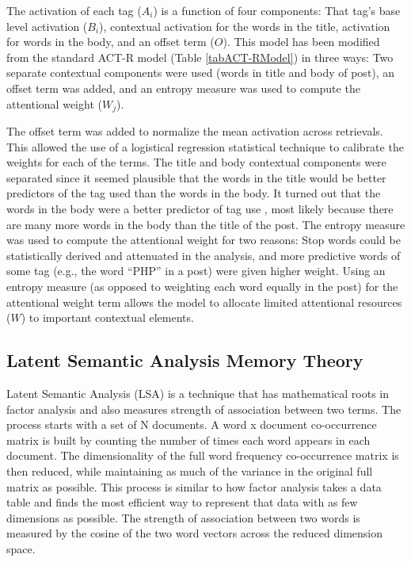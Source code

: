\documentclass[man,floatsintext,donotrepeattitle]{apa6}
\begin{document}
The activation of each tag ($A_{i}$) is a function of four components:
That tag's base level activation ($B_{i}$), contextual activation for the words in the title, activation for words in the body, and an offset term ($O$).
This model has been modified from the standard ACT-R model (Table \ref{tabACT-RModel}) in three ways:
Two separate contextual components were used (words in title and body of post), an offset term was added, and an entropy measure was used to compute the attentional weight ($W_{j}$).

The offset term was added to normalize the mean activation across retrievals.
This allowed the use of a logistical regression statistical technique to calibrate the weights for each of the terms.
The title and body contextual components were separated since it seemed plausible that the words in the title would be better predictors of the tag used than the words in the body.
It turned out that the words in the body were a better predictor of tag use \parencite{Stanley2013}, most likely because there are many more words in the body than the title of the post.
The entropy measure was used to compute the attentional weight for two reasons:
Stop words could be statistically derived and attenuated in the analysis, and more predictive words of some tag (e.g., the word ``PHP'' in a post) were given higher weight.
Using an entropy measure (as opposed to weighting each word equally in the post) for the attentional weight term allows the model to allocate limited attentional resources ($W$) to important contextual elements.

\subsection{Latent Semantic Analysis Memory Theory}

Latent Semantic Analysis \parencite{Landauer1997} (LSA) is a technique that has mathematical roots in factor analysis and also measures strength of association between two terms.
The process starts with a set of N documents.
A word x document co-occurrence matrix is built by counting the number of times each word appears in each document.
The dimensionality of the full word frequency co-occurrence matrix is then reduced, while maintaining as much of the variance in the original full matrix as possible.
This process is similar to how factor analysis takes a data table and finds the most efficient way to represent that data with as few dimensions as possible.
The strength of association between two words is measured by the cosine of the two word vectors across the reduced dimension space.
\end{document}
